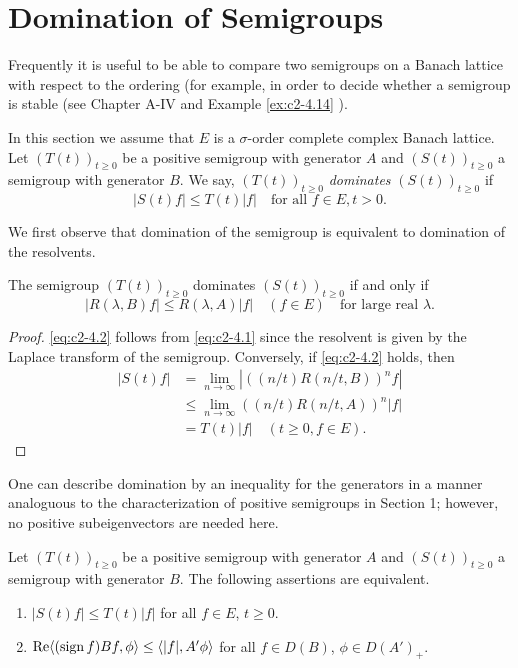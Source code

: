 \section{Domination of Semigroups} \label{sec:c2-4}
Frequently it is useful to be able to compare two semigroups on a
Banach lattice with respect to the ordering (for example, in order to
decide whether a semigroup is stable (see Chapter A-IV and Example \ref{ex:c2-4.14}   ).

In this section we assume that $E$ is a $\sigma$-order complete complex Banach lattice. 
Let $(T(t))_{t \geq 0}$ be a positive semigroup with generator $A$ and $(S(t))_{t \geq 0}$ a semigroup with generator $B$. 
We say, $(T(t))_{t \geq 0}$ \emph{dominates} $(S(t))_{t \geq 0}$ if
\begin{equation}\label{eq:c2-4.1}
|S(t)f| \leq T(t)|f| \quad \text{for all } f \in E, t > 0.
\end{equation}

We first observe that domination of the semigroup is equivalent to domination of the resolvents.

\begin{proposition}\label{prop:c2-4.1}
The semigroup $(T(t))_{t \geq 0}$ dominates $(S(t))_{t \geq 0}$ if and only if
\begin{equation}\label{eq:c2-4.2}
|R(\lambda,B)f| \leq R(\lambda,A)|f| \quad (f \in E) \quad \text{for large real }  \lambda.
\end{equation}
\end{proposition}
\begin{proof}
\eqref{eq:c2-4.2} follows from \eqref{eq:c2-4.1} since the resolvent is given by the Laplace transform of the semigroup. 
Conversely, if \eqref{eq:c2-4.2} holds, then
\begin{align*}
|S(t)f| &= \lim_{n \to \infty} |((n/t)R(n/t,B))^{n}f|\\
&\leq \lim_{n \to \infty} ((n/t)R(n/t,A))^{n}|f|\\
&= T(t)|f| \quad (t \geq 0, f \in E).
\end{align*}
\end{proof}
One can describe domination by an inequality for the generators in a manner analoguous to the characterization of positive semigroups in Section 1; however, no positive subeigenvectors are needed here.

\begin{theorem}\label{thm:c2-4.2}
Let $(T(t))_{t \geq 0}$ be a positive semigroup with generator $A$ and $(S(t))_{t \geq 0}$ a semigroup with generator $B$. The following assertions are equivalent.
\begin{enumerate}[\upshape (a)]
\item \label{thm:c2-4.2-1}
$|S(t)f| \leq T(t)|f|$ for all $f \in E$, $t \geq 0$.
\item \label{thm:c2-4.2-2}
$\mathop{}\!\mathrm{Re}\langle(\operatorname{sign}  f)Bf,\phi\rangle \leq \langle|f|,A'\phi\rangle$ for all $f \in D(B)$, $\phi \in D(A')_{+}$.
\end{enumerate}
\end{theorem}

